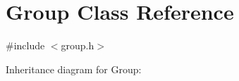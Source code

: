 \hypertarget{classGroup}{}\section{Group Class Reference}
\label{classGroup}


{\ttfamily \#include $<$group.\+h$>$}



Inheritance diagram for Group\+:
